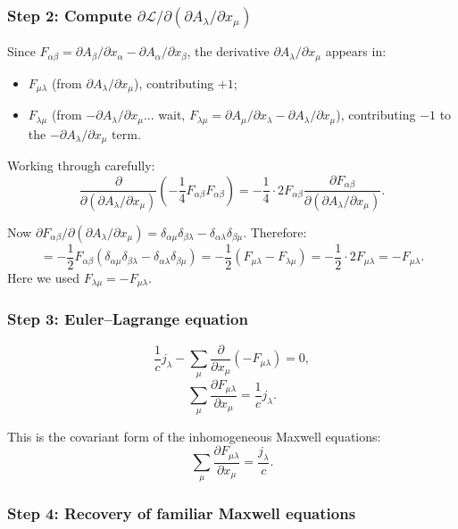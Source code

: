 \documentclass[12pt]{article}
\begin{document}
\subsubsection*{Step 2: Compute $\partial\mathscr{L}/\partial(\partial A_\lambda/\partial x_\mu)$}

Since $F_{\alpha\beta} = \partial A_\beta/\partial x_\alpha - \partial A_\alpha/\partial x_\beta$, the derivative $\partial A_\lambda/\partial x_\mu$ appears in:
\begin{itemize}
  \item $F_{\mu\lambda}$ (from $\partial A_\lambda/\partial x_\mu$), contributing $+1$;
  \item $F_{\lambda\mu}$ (from $-\partial A_\lambda/\partial x_\mu$... wait, $F_{\lambda\mu} = \partial A_\mu/\partial x_\lambda - \partial A_\lambda/\partial x_\mu$), contributing $-1$ to the $-\partial A_\lambda/\partial x_\mu$ term.
\end{itemize}

Working through carefully:
\[
  \frac{\partial}{\partial(\partial A_\lambda/\partial x_\mu)}\left(-\frac{1}{4}F_{\alpha\beta}F_{\alpha\beta}\right)
  = -\frac{1}{4}\cdot 2 F_{\alpha\beta}\frac{\partial F_{\alpha\beta}}{\partial(\partial A_\lambda/\partial x_\mu)}.
\]

Now $\partial F_{\alpha\beta}/\partial(\partial A_\lambda/\partial x_\mu) = \delta_{\alpha\mu}\delta_{\beta\lambda} - \delta_{\alpha\lambda}\delta_{\beta\mu}$. Therefore:
\[
  = -\frac{1}{2}F_{\alpha\beta}(\delta_{\alpha\mu}\delta_{\beta\lambda} - \delta_{\alpha\lambda}\delta_{\beta\mu})
  = -\frac{1}{2}(F_{\mu\lambda} - F_{\lambda\mu})
  = -\frac{1}{2}\cdot 2F_{\mu\lambda} = -F_{\mu\lambda}.
\]
Here we used $F_{\lambda\mu} = -F_{\mu\lambda}$.

\subsubsection*{Step 3: Euler--Lagrange equation}

\[
  \frac{1}{c}j_\lambda - \sum_\mu \frac{\partial}{\partial x_\mu}(-F_{\mu\lambda}) = 0,
\]
\[
  \sum_\mu \frac{\partial F_{\mu\lambda}}{\partial x_\mu} = \frac{1}{c}j_\lambda.
\]

This is the covariant form of the inhomogeneous Maxwell equations:
\[
  \boxed{\sum_\mu \frac{\partial F_{\mu\lambda}}{\partial x_\mu} = \frac{j_\lambda}{c}.}
\]

\subsubsection*{Step 4: Recovery of familiar Maxwell equations}
\end{document}
